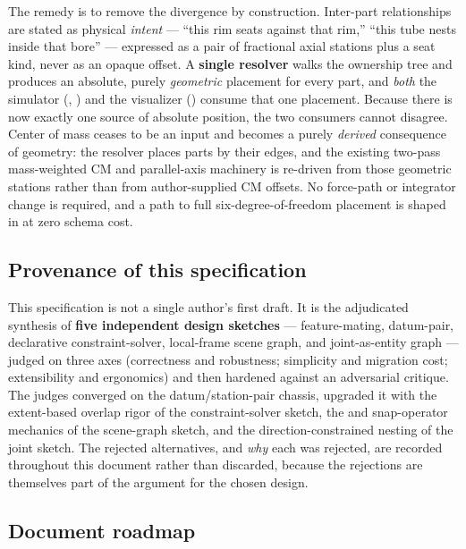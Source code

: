 The remedy is to remove the divergence by construction. Inter-part relationships are stated as
physical \emph{intent} --- ``this rim seats against that rim,'' ``this tube nests inside that bore''
--- expressed as a pair of fractional axial stations plus a seat kind, never as an opaque offset. A
\textbf{single resolver} walks the ownership tree and produces an absolute, purely \emph{geometric}
placement for every part, and \emph{both} the simulator (,
) and the visualizer () consume that one placement.
Because there is now exactly one source of absolute position, the two consumers cannot disagree.
Center of mass ceases to be an input and becomes a purely \emph{derived} consequence of geometry:
the resolver places parts by their edges, and the existing two-pass mass-weighted CM and
parallel-axis machinery is re-driven from those geometric stations rather than from author-supplied
CM offsets. No force-path or integrator change is required, and a path to full six-degree-of-freedom
placement is shaped in at zero schema cost.

\subsection{Provenance of this specification}

This specification is not a single author's first draft. It is the adjudicated synthesis of
\textbf{five independent design sketches} --- feature-mating, datum-pair, declarative
constraint-solver, local-frame scene graph, and joint-as-entity graph --- judged on three axes
(correctness and robustness; simplicity and migration cost; extensibility and ergonomics) and then
hardened against an adversarial critique. The judges converged on the datum/station-pair chassis,
upgraded it with the extent-based overlap rigor of the constraint-solver sketch, the  and
snap-operator mechanics of the scene-graph sketch, and the direction-constrained nesting of the joint
sketch. The rejected alternatives, and \emph{why} each was rejected, are recorded throughout this
document rather than discarded, because the rejections are themselves part of the argument for the
chosen design.

\subsection{Document roadmap}

